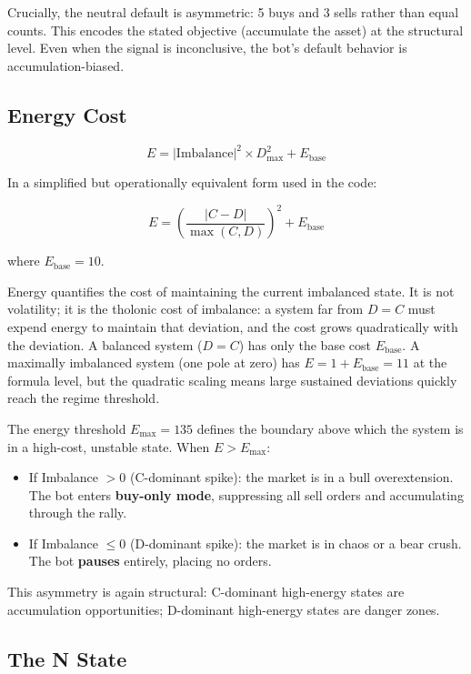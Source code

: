 \documentclass[12pt]{article}
\providecommand{\tightlist}{%
  \setlength{\itemsep}{0pt}\setlength{\parskip}{0pt}}
\begin{document}
Crucially, the neutral default is asymmetric: 5 buys and 3 sells rather
than equal counts. This encodes the stated objective (accumulate the
asset) at the structural level. Even when the signal is inconclusive,
the bot's default behavior is accumulation-biased.

\subsection{Energy Cost}\label{energy-cost}

\[E = |\text{Imbalance}|^2 \times D_{\text{max}}^2 + E_{\text{base}}\]

In a simplified but operationally equivalent form used in the code:

\[E = \left(\frac{|C - D|}{\max(C, D)}\right)^2 + E_{\text{base}}\]

where \(E_{\text{base}} = 10\).

Energy quantifies the cost of maintaining the current imbalanced state.
It is not volatility; it is the tholonic cost of imbalance: a system far
from \(D = C\) must expend energy to maintain that deviation, and the
cost grows quadratically with the deviation. A balanced system
(\(D = C\)) has only the base cost \(E_{\text{base}}\). A maximally
imbalanced system (one pole at zero) has
\(E = 1 + E_{\text{base}} = 11\) at the formula level, but the quadratic
scaling means large sustained deviations quickly reach the regime
threshold.

The energy threshold \(E_{\text{max}} = 135\) defines the boundary above
which the system is in a high-cost, unstable state. When
\(E > E_{\text{max}}\):

\begin{itemize}
\tightlist
\item
  If Imbalance \(> 0\) (C-dominant spike): the market is in a bull
  overextension. The bot enters \textbf{buy-only mode}, suppressing all
  sell orders and accumulating through the rally.
\item
  If Imbalance \(\leq 0\) (D-dominant spike): the market is in chaos or
  a bear crush. The bot \textbf{pauses} entirely, placing no orders.
\end{itemize}

This asymmetry is again structural: C-dominant high-energy states are
accumulation opportunities; D-dominant high-energy states are danger
zones.

\subsection{The N State}\label{the-n-state}
\end{document}
